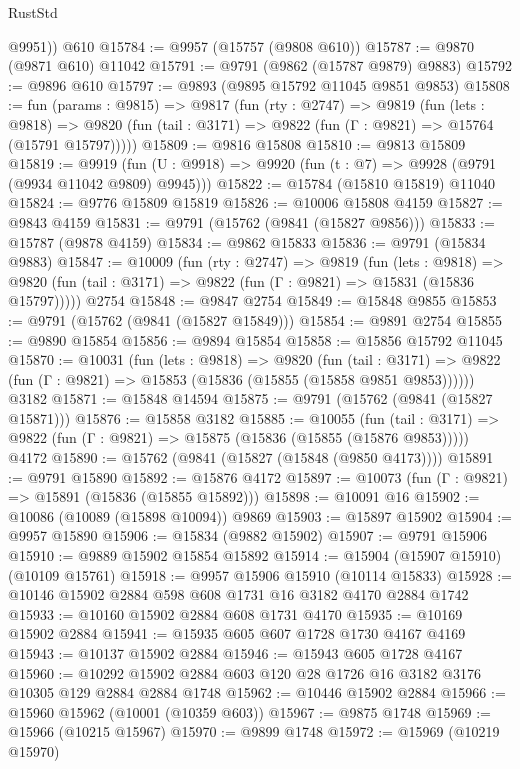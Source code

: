 \begin{lexlean}{RustStd}
\begin{coremodule}
        @9951))
    @610
@15784 := @9957 (@15757 (@9808 @610))
@15787 := @9870 (@9871 @610) @11042
@15791 := @9791 (@9862 (@15787 @9879) @9883)
@15792 := @9896 @610
@15797 := @9893 (@9895 @15792 @11045 @9851 @9853)
@15808 := fun (params : @9815) =>
  @9817
    (fun (rty : @2747) =>
    @9819
      (fun (lets : @9818) =>
      @9820 (fun (tail : @3171) => @9822 (fun (Γ : @9821) => @15764 (@15791 @15797)))))
@15809 := @9816 @15808
@15810 := @9813 @15809
@15819 := @9919
    (fun (U : @9918) => @9920 (fun (t : @7) => @9928 (@9791 (@9934 @11042 @9809) @9945)))
@15822 := @15784 (@15810 @15819) @11040
@15824 := @9776 @15809 @15819
@15826 := @10006 @15808 @4159
@15827 := @9843 @4159
@15831 := @9791 (@15762 (@9841 (@15827 @9856)))
@15833 := @15787 (@9878 @4159)
@15834 := @9862 @15833
@15836 := @9791 (@15834 @9883)
@15847 := @10009
    (fun (rty : @2747) =>
    @9819
      (fun (lets : @9818) =>
      @9820 (fun (tail : @3171) => @9822 (fun (Γ : @9821) => @15831 (@15836 @15797)))))
    @2754
@15848 := @9847 @2754
@15849 := @15848 @9855
@15853 := @9791 (@15762 (@9841 (@15827 @15849)))
@15854 := @9891 @2754
@15855 := @9890 @15854
@15856 := @9894 @15854
@15858 := @15856 @15792 @11045
@15870 := @10031
    (fun (lets : @9818) =>
    @9820
      (fun (tail : @3171) =>
      @9822 (fun (Γ : @9821) => @15853 (@15836 (@15855 (@15858 @9851 @9853))))))
    @3182
@15871 := @15848 @14594
@15875 := @9791 (@15762 (@9841 (@15827 @15871)))
@15876 := @15858 @3182
@15885 := @10055
    (fun (tail : @3171) => @9822 (fun (Γ : @9821) => @15875 (@15836 (@15855 (@15876 @9853)))))
    @4172
@15890 := @15762 (@9841 (@15827 (@15848 (@9850 @4173))))
@15891 := @9791 @15890
@15892 := @15876 @4172
@15897 := @10073 (fun (Γ : @9821) => @15891 (@15836 (@15855 @15892)))
@15898 := @10091 @16
@15902 := @10086 (@10089 (@15898 @10094)) @9869
@15903 := @15897 @15902
@15904 := @9957 @15890
@15906 := @15834 (@9882 @15902)
@15907 := @9791 @15906
@15910 := @9889 @15902 @15854 @15892
@15914 := @15904 (@15907 @15910) (@10109 @15761)
@15918 := @9957 @15906 @15910 (@10114 @15833)
@15928 := @10146 @15902 @2884 @598 @608 @1731 @16 @3182 @4170 @2884 @1742
@15933 := @10160 @15902 @2884 @608 @1731 @4170
@15935 := @10169 @15902 @2884
@15941 := @15935 @605 @607 @1728 @1730 @4167 @4169
@15943 := @10137 @15902 @2884
@15946 := @15943 @605 @1728 @4167
@15960 := @10292 @15902 @2884 @603 @120 @28 @1726 @16 @3182 @3176 @10305 @129 @2884 @2884 @1748
@15962 := @10446 @15902 @2884
@15966 := @15960 @15962 (@10001 (@10359 @603))
@15967 := @9875 @1748
@15969 := @15966 (@10215 @15967)
@15970 := @9899 @1748
@15972 := @15969 (@10219 @15970)

\end{coremodule}
\end{lexlean}
